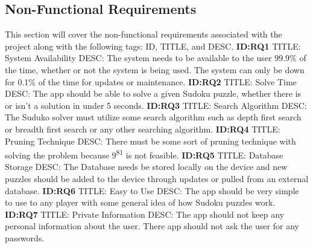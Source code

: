 \documentclass{article}
\begin{document}
\subsection{Non-Functional Requirements} 
This section will cover the non-functional requirements associated with the project along with the following tags: ID, TITLE, and DESC. \newline \newline
\textbf{ID:RQ1} \newline TITLE: System Availability \newline DESC: The system needs to  be available to the user 99.9\% of the time, whether or not the system is being used. The system can only be down for 0.1\% of the time for updates or maintenance. \newline \newline
\textbf{ID:RQ2} \newline TITLE: Solve Time \newline DESC: The app should be able to solve a given Sudoku puzzle, whether there is or isn't a solution in under 5 seconds.\newline \newline
\textbf{ID:RQ3} \newline TITLE: Search Algorithm \newline DESC: The Suduko solver must utilize some search algorithm such as depth first search or breadth first search or any other searching algorithm. \newline \newline
\textbf{ID:RQ4} \newline TITLE: Pruning Technique \newline DESC: There must be some sort of pruning technique with solving the problem because 9\textsuperscript{81} is not feasible. \newline \newline
\textbf{ID:RQ5} \newline TITLE: Database Storage \newline DESC: The Database needs be stored locally on the device and new puzzles should be added to the device through updates or pulled from an external database. \newline \newline
\textbf{ID:RQ6} \newline TITLE: Easy to Use \newline DESC: The app should be very simple to use to any player with some general idea of how Sudoku puzzles work. \newline \newline
\textbf{ID:RQ7} \newline TITLE: Private Information \newline DESC: The app should not keep any personal information about the user. There app should not ask the user for any passwords. \newline \newline
\end{document}
